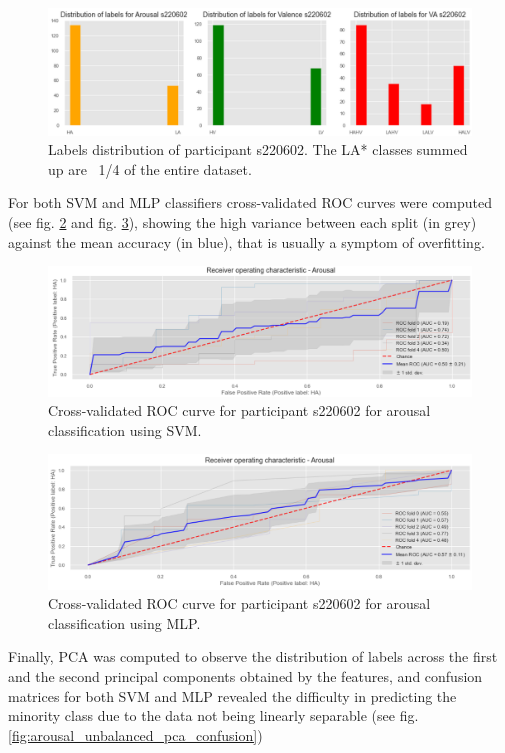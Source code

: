 \begin{figure}[!htb]
\includegraphics[width=16cm]{img/appendix/arousal_unbalanced_distribution.png}
\centering
\caption{Labels distribution of participant s220602. The LA* classes summed up are ~1/4 of the entire dataset.}\label{fig:arousal_unbalanced_distribution}
\end{figure}
\FloatBarrier
For both \ac{SVM} and \ac{MLP} classifiers cross-validated ROC curves were computed (see fig. \ref{fig:arousal_unbalanced_roc_svm} and fig. \ref{fig:arousal_unbalanced_roc_mlp}), showing the high variance between each split (in grey) against the mean accuracy (in blue), that is usually a symptom of overfitting.


\begin{figure}[!htb]
\includegraphics[width=16cm]{img/appendix/arousal_unbalanced_roc_svm.png}
\centering
\caption{Cross-validated ROC curve for participant s220602 for arousal classification using SVM.}\label{fig:arousal_unbalanced_roc_svm}
\end{figure}

\begin{figure}[!htb]
\includegraphics[width=16cm]{img/appendix/arousal_unbalanced_roc_mlp.png}
\centering
\caption{Cross-validated ROC curve for participant s220602 for arousal classification using MLP.}\label{fig:arousal_unbalanced_roc_mlp}
\end{figure}
\FloatBarrier
Finally, \ac{PCA} was computed to observe the distribution of labels across the first and the second principal components obtained by the features, and confusion matrices for both \ac{SVM} and \ac{MLP} revealed the difficulty in predicting the minority class due to the data not being linearly separable (see fig. \ref{fig:arousal_unbalanced_pca_confusion})

